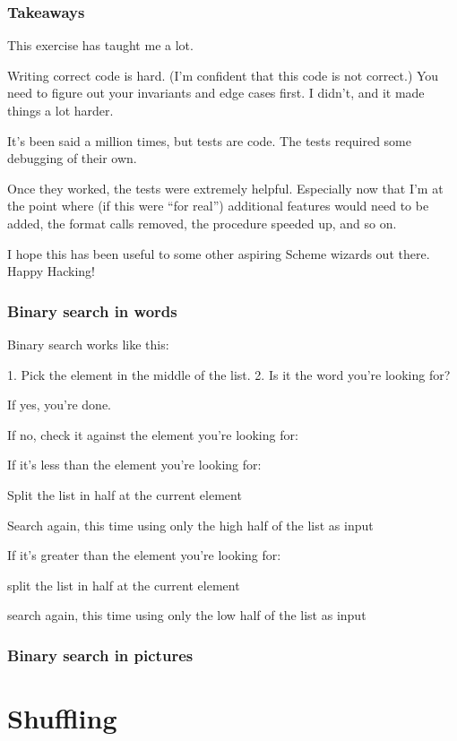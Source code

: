 \documentclass[12pt,openright,draft]{book}
\begin{document}
\subsubsection{Takeaways}

This exercise has taught me a lot. 

Writing correct code is hard. (I'm confident that this code is not
correct.) You need to figure out your invariants and edge cases
first. I didn't, and it made things a lot harder.

It's been said a million times, but tests are code. The tests required
some debugging of their own.

Once they worked, the tests were extremely helpful. Especially now
that I'm at the point where (if this were ``for real'') additional
features would need to be added, the format calls removed, the
procedure speeded up, and so on.

I hope this has been useful to some other aspiring Scheme wizards out
there. Happy Hacking!

\subsubsection{Binary search in words}

Binary search works like this:

1. Pick the element in the middle of the list.
2. Is it the word you're looking for?

If yes, you're done.

If no, check it against the element you're looking for:

If it's less than the element you're looking for:

Split the list in half at the current element

Search again, this time using only the high half of the list as
input

If it's greater than the element you're looking for:

split the list in half at the current element

search again, this time using only the low half of the list as
input

\subsubsection{Binary search in pictures}


\section{Shuffling}
\end{document}
